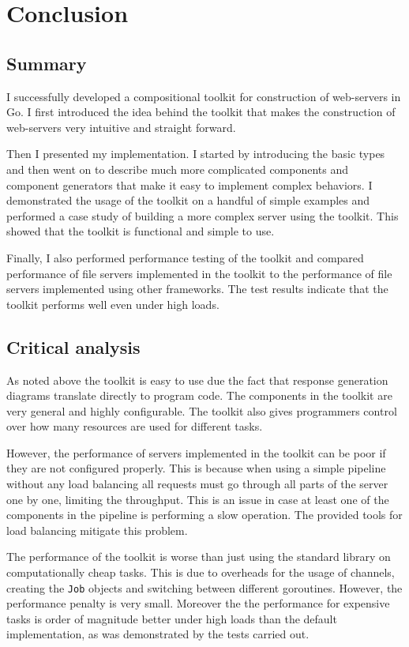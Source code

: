 \section{Conclusion}
\label{sec:conclusion}
\subsection{Summary}
I successfully developed a compositional toolkit for construction of 
web-servers in Go. I first introduced the idea behind the toolkit that 
makes the construction of web-servers very intuitive and straight forward. 

Then I presented my implementation. I started by introducing the basic types
and then went on to describe much more complicated components and component generators
that make it easy to implement complex behaviors. I demonstrated the usage of the 
toolkit on a handful of simple examples and performed a case study of building
a more complex server using the toolkit. This showed that the toolkit is
functional and simple to use. 

Finally, I also performed performance testing of the toolkit and compared
performance of file servers implemented in the toolkit to the performance
of file servers implemented using other frameworks. The test results indicate
that the toolkit performs well even under high loads.

\subsection{Critical analysis}
As noted above the toolkit is easy to use due the fact that response 
generation diagrams translate directly to program code. The components
in the toolkit are very general and highly configurable. The toolkit
also gives programmers control over how many resources are used for 
different tasks. 

However, the performance of servers implemented in the toolkit can be 
poor if they are not configured properly. This is because when using a simple
pipeline without any load balancing all requests must go through all parts
of the server one by one, limiting the throughput. This is an issue 
in case at least one of the components in the pipeline is performing a slow operation.
The provided tools for load balancing mitigate this problem.

The performance of the toolkit is worse than just using the standard library
on computationally cheap tasks. This is due to overheads
for the usage of channels, creating the \texttt{Job} objects
and switching between different goroutines. However, the performance
penalty is very small. Moreover the the performance for expensive 
tasks is order of magnitude better under high loads than the default implementation,
as was demonstrated by the tests carried out.

